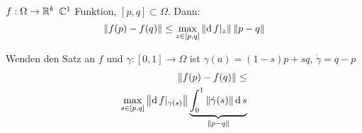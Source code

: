 \begin{Kor}
  $f:\Omega\rightarrow\mathbb{R}^k$ $\mathbb{C}^1$ Funktion, $[p,q]\subset\Omega$. Dann:
  \[\left\| f(p)-f(q) \right\|\leq\max_{z\in [p,q]}\left\| \operatorname{d} f|_z \right\|\left\| p-q \right\|\]
\end{Kor}
\begin{Bew}
  Wenden den Satz an $f$ und $\gamma:[0,1]\to\Omega$ ist $\gamma(a)=(1-s)p+sq$, $\dot \gamma=q-p$
  \begin{eqnarray*}
    \left\| f(p)-f(q) \right\|\leq\\
    \max_{s\in [p,q]}\left\| \operatorname{d} f|_{\gamma(s)} \right\|\underbrace{\int_0^1\left\| \dot\gamma(s) \right\|\operatorname{d} s}_{\left\| p-q \right\|}
  \end{eqnarray*}
\end{Bew}
